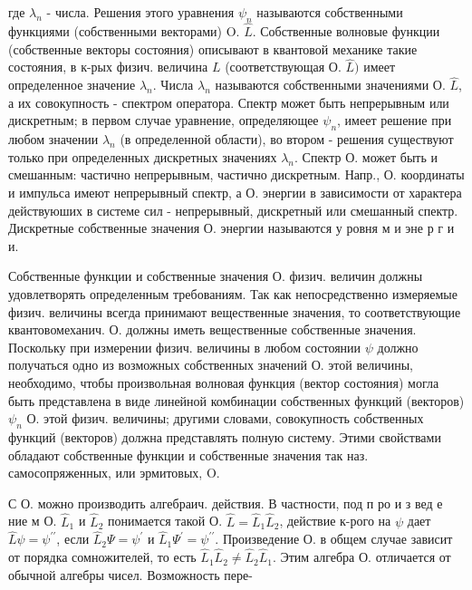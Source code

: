 \documentclass[10pt]{article}
\begin{document}
где $\lambda_{n}$ - числа. Решения этого уравнения $\psi_{n}$ называются собственными функциями (собственными векторами) O. $\hat{L}$. Собственные волновые функции (собственные векторы состояния) описывают в квантовой механике такие состояния, в к-рых физич. величина $L$ (соответствующая О. $\hat{L})$ имеет определенное значение $\lambda_{n}$. Числа $\lambda_{n}$ называются собственными значениями О. $\hat{L}$, а их совокупность - спектром оператора. Спектр может быть непрерывным или дискретным; в первом случае уравнение, определяющее $\psi_{n}$, имеет решение при любом значении $\lambda_{n}$ (в определенной области), во втором - решения существуют только при определенных дискретных значениях $\lambda_{n}$. Спектр О. может быть и смешанным: частично непрерывным, частично дискретным. Напр., О. координаты и импульса имеют непрерывный спектр, а О. энергии в зависимости от характера действуюших в системе сил - непрерывный, дискретный или смешанный спектр. Дискретные собственные значения О. энергии называются у ровня м и эне р г и и.



Собственные функции и собственные значения О. физич. величин должны удовлетворять определенным требованиям. Так как непосредственно измеряемые физич. величины всегда принимают вещественные значения, то соответствующие квантовомеханич. О. должны иметь вещественные собственные значения. Поскольку при измерении физич. величины в любом состоянии $\psi$ должно получаться одно из возможных собственных значений О. этой величины, необходимо, чтобы произвольная волновая функция (вектор состояния) могла быть представлена в виде линейной комбинации собственных функций (векторов) $\psi_{n}$ О. этой физич. величины; другими словами, совокупность собственных функций (векторов) должна представлять полную систему. Этими свойствами обладают собственные функции и собственные значения так наз. самосопряженных, или эрмитовых, $\mathrm{O}$.



С О. можно производить алгебраич. действия. В частности, под п ро и з вед е ние м О. $\hat{L}_{1}$ и $\hat{L}_{2}$ понимается такой О. $\hat{L}=\hat{L}_{1} \hat{L}_{2}$, действие к-рого на $\psi$ дает $\hat{L} \psi=\psi^{\prime \prime}$, если $\hat{L}_{2} \Psi=\psi^{\prime}$ и $\hat{L}_{1} \Psi^{\prime}=\psi^{\prime \prime}$. Произведение О. в общем случае зависит от порядка сомножителей, то есть $\hat{L}_{1} \hat{L}_{2} \neq \hat{L}_{2} \hat{L}_{1}$. Этим алгебра О. отличается от обычной алгебры чисел. Возможность пере-
\end{document}
